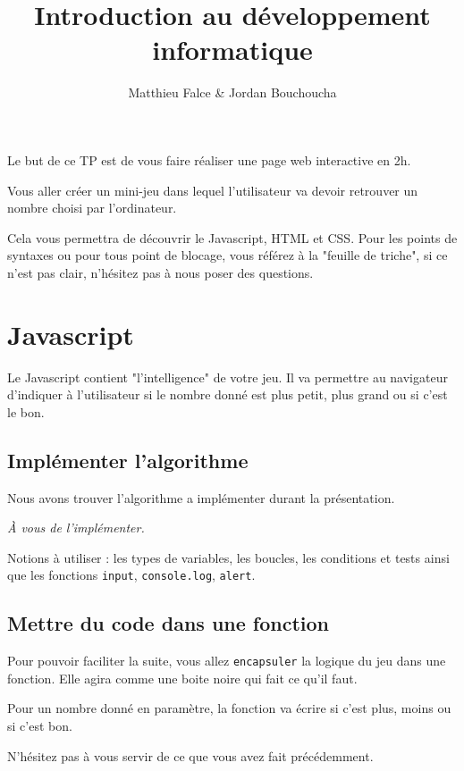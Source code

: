 \documentclass{article} %
\title{Introduction au développement informatique}
\author{Matthieu Falce \& Jordan Bouchoucha}
\begin{document}
\maketitle

Le but de ce TP est de vous faire réaliser une page web interactive en 2h. 

Vous aller créer un mini-jeu dans lequel l'utilisateur va devoir retrouver un nombre choisi par l'ordinateur.

Cela vous permettra de découvrir le Javascript, HTML et CSS. Pour les points de syntaxes ou pour tous point de blocage, vous référez à la "feuille de triche", si ce n'est pas clair, n'hésitez pas à nous poser des questions.

\section{Javascript}

Le Javascript contient "l'intelligence" de votre jeu. Il va permettre au navigateur d'indiquer à l'utilisateur si le nombre donné est plus petit, plus grand ou si c'est le bon. 

\subsection{Implémenter l'algorithme}

Nous avons trouver l'algorithme a implémenter durant la présentation. 

\begin{center}
	\emph{\`A vous de l'implémenter. }
\end{center}

Notions à utiliser : les types de variables, les boucles, les conditions et tests ainsi que les fonctions \texttt{input}, \texttt{console.log}, \texttt{alert}.

\subsection{Mettre du code dans une fonction}

Pour pouvoir faciliter la suite, vous allez \texttt{encapsuler} la logique du jeu dans une fonction. Elle agira comme une boite noire qui fait ce qu'il faut. 

Pour un nombre donné en paramètre, la fonction va écrire si c'est plus, moins ou si c'est bon. 

N'hésitez pas à vous servir de ce que vous avez fait précédemment. 
\end{document}
